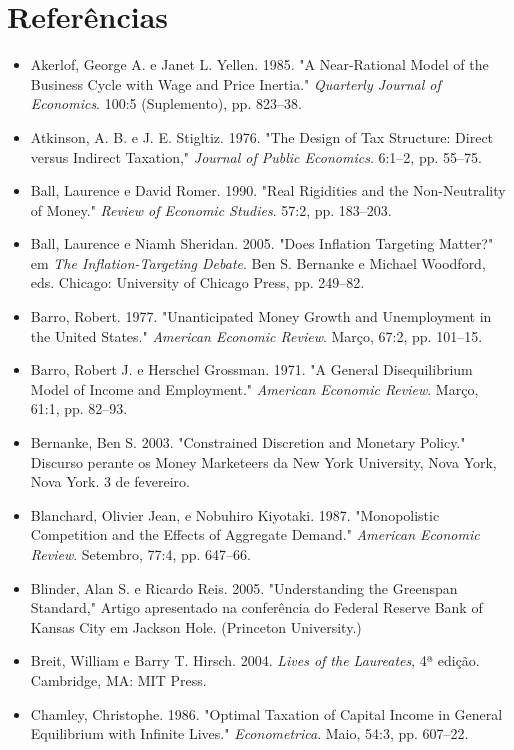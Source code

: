 \documentclass[12pt]{article}
\begin{document}
\section*{Referências}

\begin{itemize}
    \item Akerlof, George A. e Janet L. Yellen. 1985. "A Near-Rational Model of the Business Cycle with Wage and Price Inertia." \textit{Quarterly Journal of Economics}. 100:5 (Suplemento), pp. 823–38.
    \item Atkinson, A. B. e J. E. Stigltiz. 1976. "The Design of Tax Structure: Direct versus Indirect Taxation," \textit{Journal of Public Economics}. 6:1–2, pp. 55–75.
    \item Ball, Laurence e David Romer. 1990. "Real Rigidities and the Non-Neutrality of Money." \textit{Review of Economic Studies}. 57:2, pp. 183–203.
    \item Ball, Laurence e Niamh Sheridan. 2005. "Does Inflation Targeting Matter?" em \textit{The Inflation-Targeting Debate}. Ben S. Bernanke e Michael Woodford, eds. Chicago: University of Chicago Press, pp. 249–82.
    \item Barro, Robert. 1977. "Unanticipated Money Growth and Unemployment in the United States." \textit{American Economic Review}. Março, 67:2, pp. 101–15.
    \item Barro, Robert J. e Herschel Grossman. 1971. "A General Disequilibrium Model of Income and Employment." \textit{American Economic Review}. Março, 61:1, pp. 82–93.
    \item Bernanke, Ben S. 2003. "Constrained Discretion and Monetary Policy." Discurso perante os Money Marketeers da New York University, Nova York, Nova York. 3 de fevereiro.
    \item Blanchard, Olivier Jean, e Nobuhiro Kiyotaki. 1987. "Monopolistic Competition and the Effects of Aggregate Demand." \textit{American Economic Review}. Setembro, 77:4, pp. 647–66.
    \item Blinder, Alan S. e Ricardo Reis. 2005. "Understanding the Greenspan Standard," Artigo apresentado na conferência do Federal Reserve Bank of Kansas City em Jackson Hole. (Princeton University.)
    \item Breit, William e Barry T. Hirsch. 2004. \textit{Lives of the Laureates}, 4ª edição. Cambridge, MA: MIT Press.
    \item Chamley, Christophe. 1986. "Optimal Taxation of Capital Income in General Equilibrium with Infinite Lives." \textit{Econometrica}. Maio, 54:3, pp. 607–22.

\end{itemize}
\end{document}
